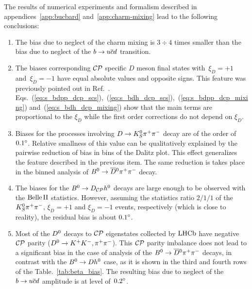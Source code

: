 \documentclass[a4paper,11pt]{article}
\begin{document}
The results of numerical experiments and formalism described in 
appendices~\ref{app:bucbard} and~\ref{app:charm-mixing} lead to 
the following conclusions:
\begin{enumerate}
 \item The bias due to neglect of the charm mixing is $3\div 4$ times 
 smaller than the bias due to neglect of the $b\to u\overline{c}d$ transition.
 
 \item The biases corresponding $\mathcal{CP}$ specific $D$ meson final states 
 with~$\xi_D=+1$ and~$\xi_D=-1$ have equal absolute values and opposite 
 signs.  This feature was previously pointed  out in Ref.~\cite{fleischer}.  
 Eqs.~(\ref{eq:s_bdpp_dcp_scs}),~(\ref{eq:s_bdh_dcp_scs}),~(\ref{eq:s_bdpp_dcp_mixing}) 
 and~(\ref{eq:s_bdh_dcp_mixing}) show that the main terms are proportional 
 to the $\xi_D$ while the first order corrections do not depend on $\xi_D$.
 
 \item Biases for the processes involving $D\to K_S^0\pi^+\pi^-$ decay are of the order of 
 $0.1{}^{\circ}$.  Relative smallness of this value can be qualitatively 
 explained by the pairwise reduction of bias in  bins of the Dalitz 
 plot.  This effect generalizes the feature described in the previous item.  
 The same reduction is takes place in the binned analysis of $B^0\to\overline{D}{}^0\pi^+\pi^-$ decay.
 
 \item The biases for the $B^0\to D_{\mathcal{CP}}h^0$ decays are large enough 
 to be observed with the $\mathrm{Belle}\,\mathrm{II}$ statistics.  However, assuming the 
 statistics ratio $2/1/1$ of the $K_S^0\pi^+\pi^-$, $\xi_D=+1$ and $\xi_D=-1$ 
 events, respectively (which is close to reality), the residual bias is 
 about $0.1{}^{\circ}$.
 
 \item Most of the $D^0$ decays to $\mathcal{CP}$ eigenstates collected by 
 $\mathrm{LHCb}$ have negative $\mathcal{CP}$ parity ($D^0\to K^+K^-, \pi^+\pi^-$).  
 This $\mathcal{CP}$ parity imbalance does not lead to a significant 
 bias in the case of analysis of the $B^0\to\overline{D}{}^0\pi^+\pi^-$ decays, in contrast with 
 the $B^0\to D h^0$ case, as it is shown in the third and fourth rows of the 
 Table.~\ref{tab:beta_bias}.  The resulting bias due to neglect of the $b\to u\overline{c}d$ 
 amplitude is at level of~$0.2{}^{\circ}$.
\end{enumerate}
\end{document}
